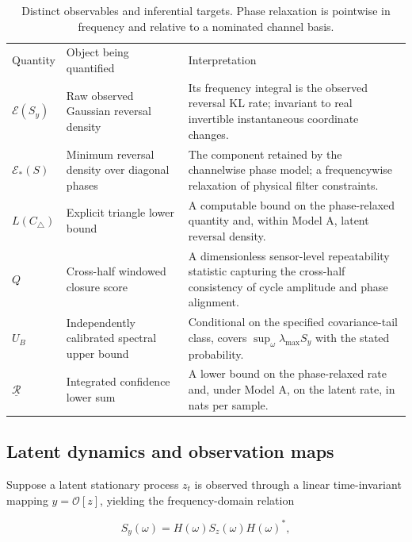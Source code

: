 \documentclass[aps,pre,reprint,amsmath,amssymb,superscriptaddress]{revtex4-2}
\begin{document}
\begin{table}[t]
\caption{\label{tab:objects}Distinct observables and inferential targets. Phase relaxation is pointwise in frequency and relative to a nominated channel basis.}
\begin{ruledtabular}
\begin{tabular}{p{}p{}p{}}
Quantity & Object being quantified & Interpretation\\
$\mathcal E(S_y)$ & Raw observed Gaussian reversal density & Its frequency integral is the observed reversal KL rate; invariant to real invertible instantaneous coordinate changes.\\
$\mathcal E_*(S)$ & Minimum reversal density over diagonal phases & The component retained by the channelwise phase model; a frequencywise relaxation of physical filter constraints.\\
$L(C_\triangle)$ & Explicit triangle lower bound & A computable bound on the phase-relaxed quantity and, within Model A, latent reversal density.\\
$Q$ & Cross-half windowed closure score & A dimensionless sensor-level repeatability statistic capturing the cross-half consistency of cycle amplitude and phase alignment.\\
$U_B$ & Independently calibrated spectral upper bound & Conditional on the specified covariance-tail class, covers $\sup_\omega\lambda_{\max}S_y$ with the stated probability.\\
$\underline{\mathcal R}$ & Integrated confidence lower sum & A lower bound on the phase-relaxed rate and, under Model A, on the latent rate, in nats per sample.\\
\end{tabular}
\end{ruledtabular}
\end{table}

\subsection{Latent dynamics and observation maps}

Suppose a latent stationary process $z_t$ is observed through a linear time-invariant mapping $y = \mathcal{O}[z]$, yielding the frequency-domain relation

\begin{equation}\label{eq:3}
\boxed{
S_y(\omega)
=
H(\omega)S_z(\omega)H(\omega)^*,
}
\end{equation}
\end{document}
